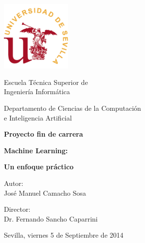 {

\thispagestyle{empty}

\begin{center}
\includegraphics[width=35mm]{figures/title/logo_us.png}
\end{center}

\vspace*{10mm}

\begin{center}
{\normalsize \sc
Escuela Técnica Superior de \\ Ingeniería Informática \\}
\end{center}

\begin{center}
{\normalsize \sc
Departamento de Ciencias de la Computación \\ e Inteligencia Artificial \\}
\end{center}

\vspace*{10mm}

\begin{center}
{\LARGE \bf
Proyecto fin de carrera}
\end{center}

\vspace*{10mm}

\begin{center}
{\huge \bf
Machine Learning:}
\end{center}

\begin{center}
{\huge \bf
Un enfoque práctico}
\end{center}

\vspace*{25mm}

\normalsize

\begin{center}
Autor: \\ José Manuel Camacho Sosa
\end{center}

\begin{center}
Director: \\ Dr. Fernando Sancho Caparrini
\end{center}

\begin{center}
Sevilla, viernes 5 de Septiembre de 2014
\end{center}

\newpage
\thispagestyle{empty}
\mbox{ }

}
